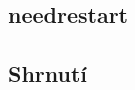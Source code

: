 \documentclass[
  field=inf,
  biblatex,
  glossaries,
  index
]{kidiplom}
\begin{document}
	\subsection{needrestart}

	\subsection{Shrnutí}


\newpage
\end{document}
